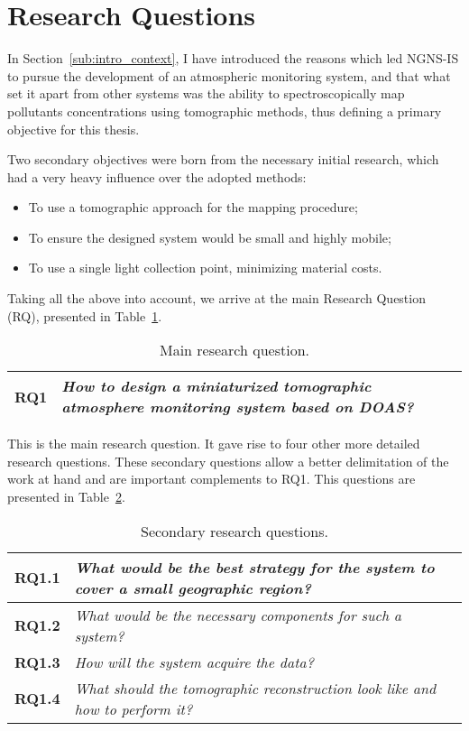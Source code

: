 
\section{Research Questions}%
\label{sec:intro_research_questions}

In Section~\ref{sub:intro_context}, I have introduced the reasons which led
NGNS-IS to pursue the development of an atmospheric monitoring system,
and that what set it apart from other systems was the ability to
spectroscopically map pollutants concentrations using tomographic
methods, thus defining a primary objective for this thesis.

Two secondary objectives were born from the necessary initial research,
which had a very heavy influence over the adopted methods:
\begin{itemize}
    \item To use a tomographic approach for the mapping procedure;
    \item To ensure the designed system would be small and highly
        mobile;
    \item To use a single light collection point, minimizing material
        costs.
\end{itemize}

Taking all the above into account, we arrive at the main Research
Question (\gls{RQ}), presented in Table~\ref{tab:RQ1}.
\begin{table}[htpb]
    \centering
    \caption{Main research question.}
    \label{tab:RQ1}
    \begin{tabularx}{0.8\textwidth}{cX}
        \toprule
        \textbf{RQ1}&\emph{ How to design a miniaturized tomographic
        atmosphere monitoring system based on DOAS? }\\
        \bottomrule
    \end{tabularx}
\end{table}

This is the main research question. It gave rise to four other more
detailed research questions. These secondary questions allow a better
delimitation of the work at hand and are important complements to RQ1.
This questions are presented in Table~\ref{tab:sec_RQ}.

\begin{table}[htpb]
    \centering
    \caption{Secondary research questions.}
    \label{tab:sec_RQ}
    \begin{tabularx}{0.8\textwidth}{cX}
        \toprule
        \textbf{RQ1.1}&\emph{ What would be the best strategy
        for the system to cover a small geographic region? }\\
        \midrule
        \textbf{RQ1.2}&\emph{ What would be the necessary
        components for such a system? }\\
        \midrule
        \textbf{RQ1.3}&\emph{ How will the system acquire the
        data? }\\
        \midrule
        \textbf{RQ1.4}&\emph{ What should the tomographic
        reconstruction look like and how to perform it? }\\
        \bottomrule
    \end{tabularx}
\end{table}

